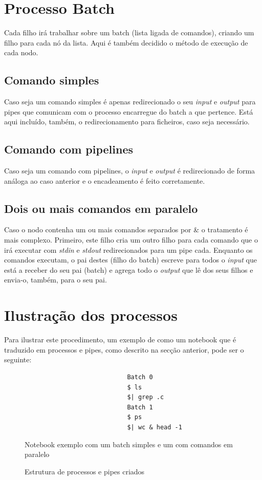 \documentclass[12pt,a4paper]{report}
\begin{document}
    \section{Processo Batch}
        Cada filho irá trabalhar sobre um batch (lista ligada de comandos),
        criando um filho para cada nó da lista. Aqui é também decidido o método
        de execução de cada nodo.
        \subsection{Comando simples}
            Caso seja um comando simples é apenas redirecionado o seu
            \textit{input} e \textit{output} para pipes que comunicam com o
            processo encarregue do batch a que pertence. Está aqui incluído,
            também, o redirecionamento para ficheiros, caso seja necessário.
        \subsection{Comando com pipelines}
            Caso seja um comando com pipelines, o \textit{input} e
            \textit{output} é redirecionado de forma análoga ao caso anterior e
            o encadeamento é feito corretamente.
        \subsection{Dois ou mais comandos em paralelo}
            Caso o nodo contenha um ou mais comandos separados por \& o
            tratamento é mais complexo. Primeiro, este filho cria um outro
            filho para cada comando que o irá executar com \textit{stdin}
            e \textit{stdout} redirecionados para um pipe cada. Enquanto os
            comandos executam, o pai destes (filho do batch) escreve para todos
            o \textit{input} que está a receber do seu pai (batch) e agrega todo
            o \textit{output} que lê dos seus filhos e envia-o, também, para o
            seu pai.
\clearpage
    \section{Ilustração dos processos}
    Para ilustrar este procedimento, um exemplo de como um notebook que é
    traduzido em processos e pipes, como descrito na secção anterior, pode
    ser o seguinte:
    \begin{figure}[h]
        \begin{verbatim}
                            Batch 0
                            $ ls
                            $| grep .c
                            Batch 1
                            $ ps
                            $| wc & head -1
        \end{verbatim}
        \caption{Notebook exemplo com um batch simples e um com comandos em
                paralelo}
    \end{figure}
    \begin{figure}[h]
        
        \caption{Estrutura de processos e pipes criados}
    \end{figure}
\end{document}
